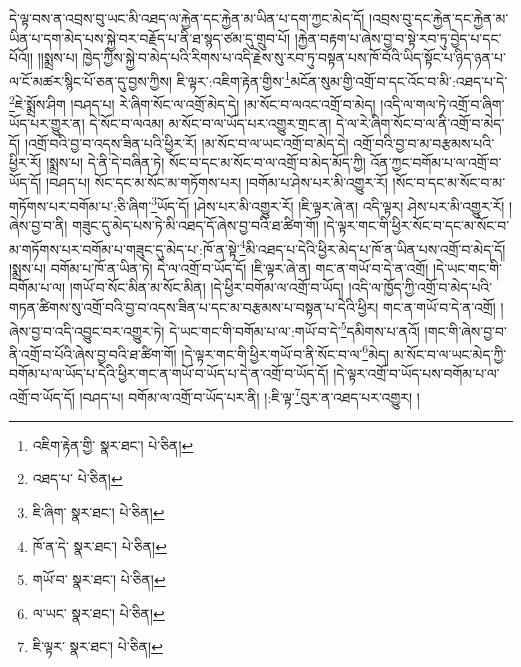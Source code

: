 དེ་ལྟ་བས་ན་འབྲས་བུ་ཡང་མི་འཐད་ལ་རྐྱེན་དང་རྐྱེན་མ་ཡིན་པ་དག་ཀྱང་མེད་དོ། །འབྲས་བུ་དང་རྐྱེན་དང་རྐྱེན་མ་ཡིན་པ་དག་མེད་པས་སྐྱེ་བར་བརྗོད་པ་ནི་ཐ་སྙད་ཙམ་དུ་གྲུབ་པོ། །རྐྱེན་བརྟག་པ་ཞེས་བྱ་བ་སྟེ་རབ་ཏུ་བྱེད་པ་དང་པོའོ།། །།སྨྲས་པ། ཁྱེད་ཀྱིས་སྐྱེ་བ་མེད་པའི་རིགས་པ་འདི་རྗེས་སུ་རབ་ཏུ་བསྟན་པས་ཁོ་བོའི་ཡིད་སྟོང་པ་ཉིད་ཉན་པ་ལ་ངོ་མཚར་སྙིང་པོ་ཅན་དུ་བྱས་ཀྱིས། ཇི་ལྟར་:འཇིག་རྟེན་གྱིས་\footnote{འཇིག་རྟེན་གྱི་  སྣར་ཐང་།  པེ་ཅིན། }མངོན་སུམ་གྱི་འགྲོ་བ་དང་འོང་བ་མི་:འཐད་པ་དེ་\footnote{འཐད་པ་  པེ་ཅིན། }ཇེ་སྨྲོས་ཤིག །བཤད་པ། རེ་ཞིག་སོང་ལ་འགྲོ་མེད་དེ། །མ་སོང་བ་ལའང་འགྲོ་བ་མེད། །འདི་ལ་གལ་ཏེ་འགྲོ་བ་ཞིག་ཡོད་པར་གྱུར་ན། དེ་སོང་བ་ལའམ། མ་སོང་བ་ལ་ཡོད་པར་འགྱུར་གྲང་ན། དེ་ལ་རེ་ཞིག་སོང་བ་ལ་ནི་འགྲོ་བ་མེད་དོ། །འགྲོ་བའི་བྱ་བ་འདས་ཟིན་པའི་ཕྱིར་རོ། །མ་སོང་བ་ལ་ཡང་འགྲོ་བ་མེད་དེ། འགྲོ་བའི་བྱ་བ་མ་བརྩམས་པའི་ཕྱིར་རོ། །སྨྲས་པ། དེ་ནི་དེ་བཞིན་ཏེ། སོང་བ་དང་མ་སོང་བ་ལ་འགྲོ་བ་མེད་མོད་ཀྱི། འོན་ཀྱང་བགོམ་པ་ལ་འགྲོ་བ་ཡོད་དོ། །བཤད་པ། སོང་དང་མ་སོང་མ་གཏོགས་པར། །བགོམ་པ་ཤེས་པར་མི་འགྱུར་རོ། །སོང་བ་དང་མ་སོང་བ་མ་གཏོགས་པར་བགོམ་པ་:ཅི་ཞིག་\footnote{ཇི་ཞིག་  སྣར་ཐང་།  པེ་ཅིན། }ཡོད་དོ། །ཤེས་པར་མི་འགྱུར་རོ། །ཇི་ལྟར་ཞེ་ན། འདི་ལྟར། ཤེས་པར་མི་འགྱུར་རོ། །ཞེས་བྱ་བ་ནི། གཟུང་དུ་མེད་པས་ཏེ་མི་འཐད་དོ་ཞེས་བྱ་བའི་ཐ་ཚིག་གོ། །དེ་ལྟར་གང་གི་ཕྱིར་སོང་བ་དང་མ་སོང་བ་མ་གཏོགས་པར་བགོམ་པ་གཟུང་དུ་མེད་པ་:ཁོ་ན་སྟེ་\footnote{ཁོ་ན་དེ་  སྣར་ཐང་།  པེ་ཅིན། }མི་འཐད་པ་དེའི་ཕྱིར་མེད་པ་ཁོ་ན་ཡིན་པས་འགྲོ་བ་མེད་དོ། །སྨྲས་པ། བགོམ་པ་ཁོ་ན་ཡིན་ཏེ། དེ་ལ་འགྲོ་བ་ཡོད་དོ། །ཇི་ལྟར་ཞེ་ན། གང་ན་གཡོ་བ་དེ་ན་འགྲོ། །དེ་ཡང་གང་གི་བགོམ་པ་ལ། །གཡོ་བ་སོང་མིན་མ་སོང་མིན། །དེ་ཕྱིར་བགོམ་ལ་འགྲོ་བ་ཡོད། །འདི་ལ་ཁྱོད་ཀྱི་འགྲོ་བ་མེད་པའི་གཏན་ཚིགས་སུ་འགྲོ་བའི་བྱ་བ་འདས་ཟིན་པ་དང་མ་བརྩམས་པ་བསྟན་པ་དེའི་ཕྱིར། གང་ན་གཡོ་བ་དེ་ན་འགྲོ། །ཞེས་བྱ་བ་འདི་འབྱུང་བར་འགྱུར་ཏེ། དེ་ཡང་གང་གི་བགོམ་པ་ལ་:གཡོ་བ་དེ་\footnote{གཡོ་བ་  སྣར་ཐང་།  པེ་ཅིན། }དམིགས་པ་ནའོ། །གང་གི་ཞེས་བྱ་བ་ནི་འགྲོ་བ་པོའི་ཞེས་བྱ་བའི་ཐ་ཚིག་གོ། །དེ་ལྟར་གང་གི་ཕྱིར་གཡོ་བ་ནི་སོང་བ་ལ་\footnote{ལ་ཡང་  སྣར་ཐང་།  པེ་ཅིན། }མེད། མ་སོང་བ་ལ་ཡང་མེད་ཀྱི་བགོམ་པ་ལ་ཡོད་པ་དེའི་ཕྱིར་གང་ན་གཡོ་བ་ཡོད་པ་དེ་ན་འགྲོ་བ་ཡོད་དོ། །དེ་ལྟར་འགྲོ་བ་ཡོད་པས་བགོམ་པ་ལ་འགྲོ་བ་ཡོད་དོ། །བཤད་པ། བགོམ་ལ་འགྲོ་བ་ཡོད་པར་ནི། །:ཇི་ལྟ་\footnote{ཇི་ལྟར་  སྣར་ཐང་།  པེ་ཅིན། }བུར་ན་འཐད་པར་འགྱུར། །
